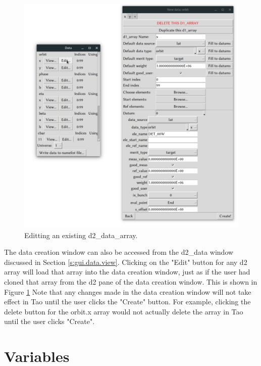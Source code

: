 \begin{figure}
\centering
\includegraphics[width=12cm]{figures/edit_data.pdf}
\caption{Editting an existing d2_data_array.}
\label{fig:gui.edit.data}
\end{figure}

The data creation window can also be accessed from the d2_data window discussed in Section \ref{s:gui.data.view}.
Clicking on the "Edit" button for any d2 array will load that array into the data creation window, just as if the user had cloned that array from the d2 pane of the data creation window.
This is shown in Figure \ref{fig:gui.edit.data}
Note that any changes made in the data creation window will not take effect in Tao until the user clicks the "Create" button.
For example, clicking the delete button for the orbit.x array would not actually delete the array in Tao until the user clicks "Create".

\section{Variables}
\label{s:gui.variables}

